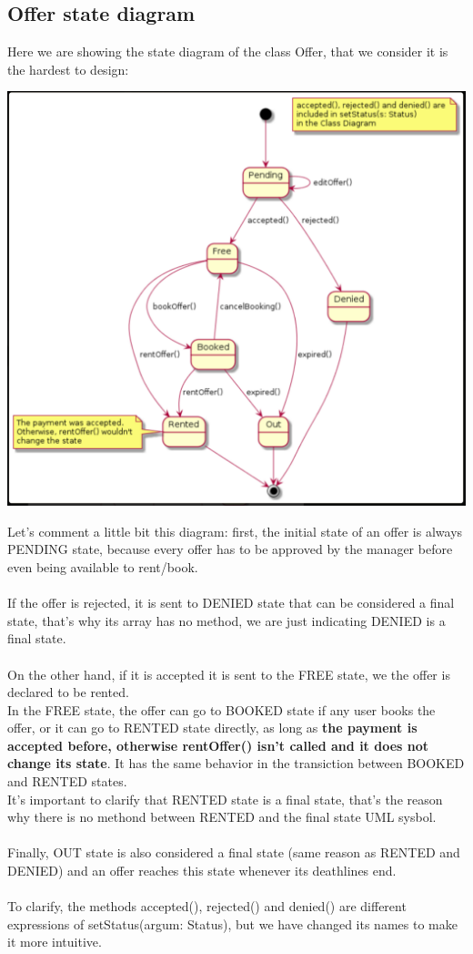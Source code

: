 \documentclass[12pt]{article}
\begin{document}
\subsection{Offer state diagram}
Here we are showing the state diagram of the class Offer, that we consider it is the hardest to design:
\begin{center}
	\includegraphics[scale=0.8]{states2.PNG}
\end{center}
Let's comment a little bit this diagram: first, the initial state of an offer is always PENDING state, because every offer has to be approved by the manager before even being available to rent/book.\\\\ 
If the offer is rejected, it is sent to DENIED state that can be considered a final state, that's why its array has no method, we are just indicating DENIED is a final state.\\\\
On the other hand, if it is accepted it is sent to the FREE state, we the offer is declared to be rented.\\In the FREE state, the offer can go to BOOKED state if any user books the offer, or it can go to RENTED state directly, as long as \textbf{the payment is accepted before, otherwise rentOffer() isn't called and it does not change its state}. It has the same behavior in the transiction between BOOKED and RENTED states.\\ It's important to clarify that RENTED state is a final state, that's the reason why there is no methond between RENTED and the final state UML sysbol.\\\\
Finally, OUT state is also considered a final state (same reason as RENTED and DENIED) and an offer reaches this state whenever its deathlines end.\\\\
To clarify, the methods accepted(), rejected() and denied() are different expressions of setStatus(argum: Status), but we have changed its names to make it more intuitive.
\end{document}
